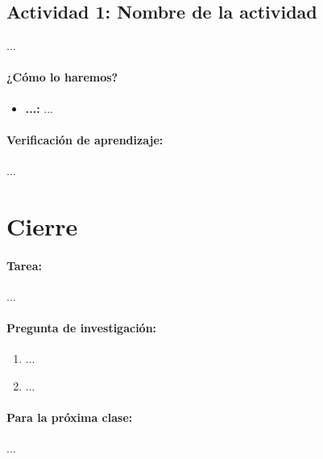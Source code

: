 \documentclass[a4,11pt]{aleph-notas}
\begin{document}
\subsection*{Actividad 1: Nombre de la actividad}
...

\paragraph{¿Cómo lo haremos?}  
\begin{itemize}[leftmargin=*]
    \item \textbf{...:} 
    ...
\end{itemize}

\paragraph{Verificación de aprendizaje:}  
...


\section*{Cierre}

\paragraph{Tarea:}
...

\paragraph{Pregunta de investigación:}  
\begin{enumerate}[leftmargin=*]
    \item ...
    \item ...
\end{enumerate}
    
\paragraph{Para la próxima clase:}  
...
\end{document}

